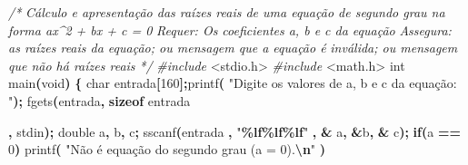 \documentclass[
  11pt,
  a4paper,
]{scrbook}
\newenvironment{Shaded}{\begin{snugshade}}{\end{snugshade}}
\newcommand{\CommentTok}[1]{\textcolor[rgb]{0.56,0.35,0.01}{\textit{#1}}}
\newcommand{\ControlFlowTok}[1]{\textcolor[rgb]{0.13,0.29,0.53}{\textbf{#1}}}
\newcommand{\DataTypeTok}[1]{\textcolor[rgb]{0.13,0.29,0.53}{#1}}
\newcommand{\DecValTok}[1]{\textcolor[rgb]{0.00,0.00,0.81}{#1}}
\newcommand{\ImportTok}[1]{#1}
\newcommand{\KeywordTok}[1]{\textcolor[rgb]{0.13,0.29,0.53}{\textbf{#1}}}
\newcommand{\NormalTok}[1]{#1}
\newcommand{\OperatorTok}[1]{\textcolor[rgb]{0.81,0.36,0.00}{\textbf{#1}}}
\newcommand{\PreprocessorTok}[1]{\textcolor[rgb]{0.56,0.35,0.01}{\textit{#1}}}
\newcommand{\SpecialCharTok}[1]{\textcolor[rgb]{0.81,0.36,0.00}{\textbf{#1}}}
\newcommand{\StringTok}[1]{\textcolor[rgb]{0.31,0.60,0.02}{#1}}
\begin{document}
\begin{Shaded}
\begin{Highlighting}[]
\CommentTok{/*}
\CommentTok{Cálculo e apresentação das raízes reais de uma equação de segundo grau na}
\CommentTok{    forma ax\^{}2 + bx + c = 0}
\CommentTok{Requer: Os coeficientes a, b e c da equação}
\CommentTok{Assegura: as raízes reais da equação; ou mensagem que a equação é}
\CommentTok{    inválida; ou mensagem que não há raízes reais}
\CommentTok{*/}
\PreprocessorTok{\#include }\ImportTok{\textless{}stdio.h\textgreater{}}
\PreprocessorTok{\#include }\ImportTok{\textless{}math.h\textgreater{}}
\DataTypeTok{int}\NormalTok{ main}\OperatorTok{(}\DataTypeTok{void}\OperatorTok{)} \OperatorTok{\{} \DataTypeTok{char}\NormalTok{ entrada}\OperatorTok{[}\DecValTok{160}\OperatorTok{];}\NormalTok{printf}\OperatorTok{(}
\StringTok{"Digite os valores de a, b e c da equação: "}\OperatorTok{);}\NormalTok{ fgets}\OperatorTok{(}\NormalTok{entrada}\OperatorTok{,} \KeywordTok{sizeof}
\NormalTok{entrada}

\OperatorTok{,}\NormalTok{ stdin}\OperatorTok{);} \DataTypeTok{double}\NormalTok{ a}\OperatorTok{,}\NormalTok{ b}\OperatorTok{,}\NormalTok{           c}\OperatorTok{;}\NormalTok{ sscanf}\OperatorTok{(}\NormalTok{entrada}
\OperatorTok{,}    \StringTok{"}\SpecialCharTok{\%lf\%lf\%lf}\StringTok{"} \OperatorTok{,} \OperatorTok{\&}\NormalTok{    a}\OperatorTok{,} \OperatorTok{\&}\NormalTok{b}\OperatorTok{,} \OperatorTok{\&}
\NormalTok{c}\OperatorTok{);}
\ControlFlowTok{if}\OperatorTok{(}\NormalTok{a }\OperatorTok{==} \DecValTok{0}\OperatorTok{)}\NormalTok{ printf}\OperatorTok{(}             \StringTok{"Não é equação do segundo grau (a = 0).}\SpecialCharTok{\textbackslash{}n}\StringTok{"}    \OperatorTok{)}


\end{Highlighting}
\end{Shaded}
\end{document}
